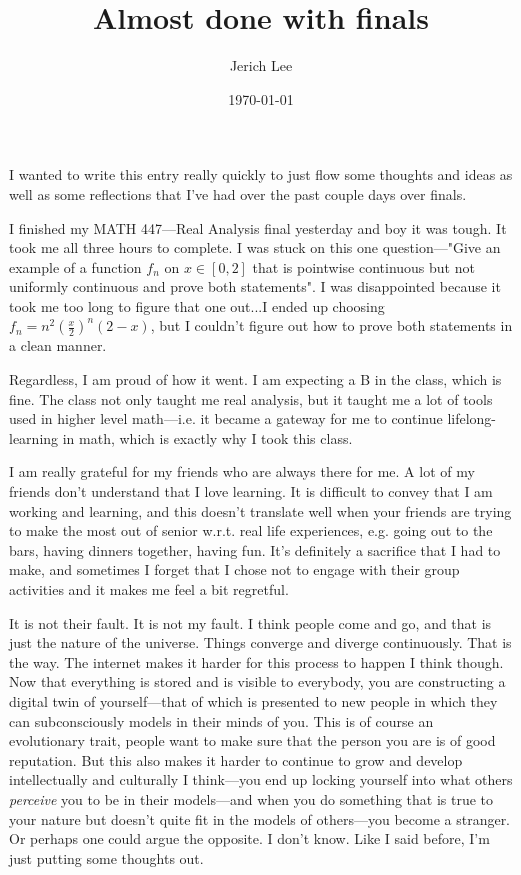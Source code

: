 \documentclass[12pt]{article}
\title{Almost done with finals}
\author{Jerich Lee}
\date{\today}
\theoremstyle{definition} %
\theoremstyle{plain} %
\begin{document}
\maketitle
I wanted to write this entry really quickly to just flow some thoughts and ideas as well as some reflections that I've had over the past couple days over finals.

I finished my MATH 447—Real Analysis final yesterday and boy it was tough. It took me all three hours to complete. I was stuck on this one question—"Give an example of a function $f_{n}$ on $x \in [0,2]$ that is pointwise continuous but not uniformly continuous and prove both statements". I was disappointed because it took me too long to figure that one out...I ended up choosing  
$f_{n}=n^{2}(\frac{x}{2})^{n}(2-x)$, but I couldn't figure out how to prove both statements in a clean manner.

Regardless, I am proud of how it went. I am expecting a B in the class, which is fine. The class not only taught me real analysis, but it taught me a lot of tools used in higher level math—i.e. it became a gateway for me to continue lifelong-learning in math, which is exactly why I took this class.

I am really grateful for my friends who are always there for me. A lot of my friends don't understand that I love learning. It is difficult to convey that I am working and learning, and this doesn't translate well when your friends are trying to make the most out of senior w.r.t. real life experiences, e.g. going out to the bars, having dinners together, having fun. It's definitely a sacrifice that I had to make, and sometimes I forget that I chose not to engage with their group activities and it makes me feel a bit regretful. 

It is not their fault. It is not my fault. I think people come and go, and that is just the nature of the universe. Things converge and diverge continuously. That is the way. The internet makes it harder for this process to happen I think though. Now that everything is stored and is visible to everybody, you are constructing a digital twin of yourself—that of which is presented to new people in which they can subconsciously models in their minds of you. This is of course an evolutionary trait, people want to make sure that the person you are is of good reputation. But this also makes it harder to continue to grow and develop intellectually and culturally I think—you end up locking yourself into what others \emph{perceive} you to be in their models—and when you do something that is true to your nature but doesn't quite fit in the models of others—you become a stranger. Or perhaps one could argue the opposite. I don't know. Like I said before, I'm just putting some thoughts out. 
\end{document}
